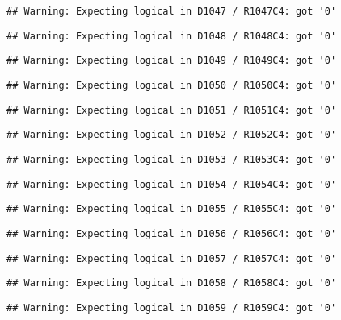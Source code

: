 \documentclass[
]{article}
\begin{document}
\begin{verbatim}
## Warning: Expecting logical in D1047 / R1047C4: got '0'
\end{verbatim}

\begin{verbatim}
## Warning: Expecting logical in D1048 / R1048C4: got '0'
\end{verbatim}

\begin{verbatim}
## Warning: Expecting logical in D1049 / R1049C4: got '0'
\end{verbatim}

\begin{verbatim}
## Warning: Expecting logical in D1050 / R1050C4: got '0'
\end{verbatim}

\begin{verbatim}
## Warning: Expecting logical in D1051 / R1051C4: got '0'
\end{verbatim}

\begin{verbatim}
## Warning: Expecting logical in D1052 / R1052C4: got '0'
\end{verbatim}

\begin{verbatim}
## Warning: Expecting logical in D1053 / R1053C4: got '0'
\end{verbatim}

\begin{verbatim}
## Warning: Expecting logical in D1054 / R1054C4: got '0'
\end{verbatim}

\begin{verbatim}
## Warning: Expecting logical in D1055 / R1055C4: got '0'
\end{verbatim}

\begin{verbatim}
## Warning: Expecting logical in D1056 / R1056C4: got '0'
\end{verbatim}

\begin{verbatim}
## Warning: Expecting logical in D1057 / R1057C4: got '0'
\end{verbatim}

\begin{verbatim}
## Warning: Expecting logical in D1058 / R1058C4: got '0'
\end{verbatim}

\begin{verbatim}
## Warning: Expecting logical in D1059 / R1059C4: got '0'
\end{verbatim}
\end{document}
